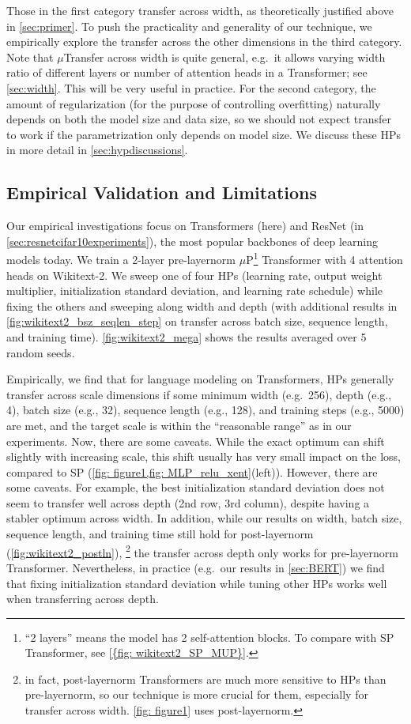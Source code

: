 \documentclass{article}
\theoremstyle{definition}
\begin{document}
Those in the first category transfer across width, as theoretically justified above in \cref{sec:primer}.
To push the practicality and generality of our technique, we empirically explore the transfer across the other dimensions in the third category.
Note that $\mu$Transfer across width is quite general, e.g.\ it allows varying width ratio of different layers or number of attention heads in a Transformer; see \cref{sec:width}.
This will be very useful in practice.
For the second category, the amount of regularization (for the purpose of controlling overfitting) naturally depends on both the model size and data size, so we should not expect transfer to work if the parametrization only depends on model size.
We discuss these HPs in more detail in \cref{sec:hypdiscussions}.

\subsection{Empirical Validation and Limitations}
\label{sec:scienceexperiments}
Our empirical investigations focus on Transformers (here) and ResNet (in \cref{sec:resnetcifar10experiments}), the most popular backbones of deep learning models today.
We train a 2-layer pre-layernorm $\mu$P\footnote{``2 layers'' means the  model has 2 self-attention blocks. To compare with SP Transformer, see \cref{{fig: wikitext2_SP_MUP}}.} Transformer with 4 attention heads on Wikitext-2.
We sweep one of four HPs (learning rate, output weight multiplier, initialization standard deviation, and learning rate schedule) while fixing the others and sweeping along width and depth (with additional results in \cref{fig:wikitext2_bsz_seqlen_step} on transfer across batch size, sequence length, and training time).
\cref{fig:wikitext2_mega} shows the results averaged over 5 random seeds.

Empirically, we find that for language modeling on Transformers, HPs generally transfer across scale dimensions if some minimum width (e.g.\ 256), depth (e.g., 4), batch size (e.g., 32), sequence length (e.g., 128), and training steps (e.g., 5000) are met, and the target scale is within the ``reasonable range'' as in our experiments.
Now, there are some caveats.
While the exact optimum can shift slightly with increasing scale, this shift usually has very small impact on the loss, compared to SP (\cref{fig: figure1,fig: MLP_relu_xent}(left)).
However, there are some caveats.
For example, the best initialization standard deviation does not seem to transfer well across depth (2nd row, 3rd column), despite having a stabler optimum across width.
In addition, while our results on width, batch size, sequence length, and training time still hold for post-layernorm (\cref{fig:wikitext2_postln}),%
\footnote{in fact, post-layernorm Transformers are much more sensitive to HPs than pre-layernorm, so our technique is more crucial for them, especially for transfer across width.
\cref{fig: figure1} uses post-layernorm.} the transfer across depth only works for pre-layernorm Transformer.
Nevertheless, in practice (e.g.\ our results in \cref{sec:BERT}) we find that fixing initialization standard deviation while tuning other HPs works well when transferring across depth.
\end{document}
